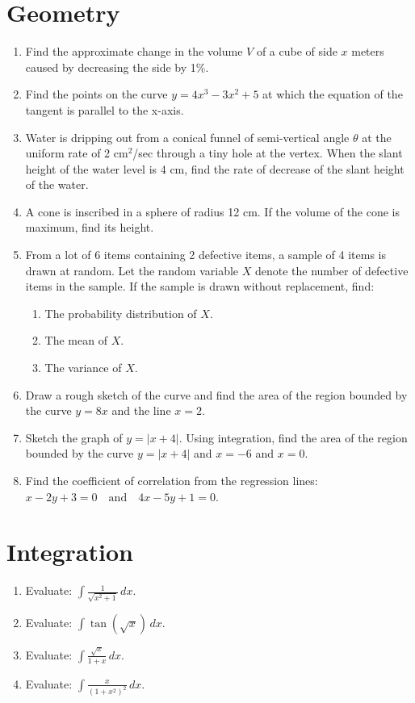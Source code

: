 \documentclass[a4paper,12pt]{article}
\begin{document}
\section{Geometry}
\begin{enumerate}


	\item Find the approximate change in the volume $V$ of a cube of side $x$ meters caused by decreasing the side by 1\%.
        \item Find the points on the curve $y = 4x^3 - 3x^2 + 5$ at which the equation of the tangent is parallel to the x-axis.
        \item Water is dripping out from a conical funnel of semi-vertical angle $\theta$ at the uniform rate of 2 cm$^2$/sec through a tiny hole at the vertex. When the slant height of the water level is 4 cm, find the rate of decrease of the slant height of the water.

        \item A cone is inscribed in a sphere of radius 12 cm. If the volume of the cone is maximum, find its height.
	\item
    From a lot of 6 items containing 2 defective items, a sample of 4 items is drawn at random. Let the random variable $X$ denote the number of defective items in the sample. If the sample is drawn without replacement, find:
    \begin{enumerate}
        \item The probability distribution of $X$.
        \item The mean of $X$.
        \item The variance of $X$.
    \end{enumerate}

    \item Draw a rough sketch of the curve and find the area of the region bounded by the curve $y = 8x$ and the line $x = 2$.
        \item Sketch the graph of $y = |x + 4|$. Using integration, find the area of the region bounded by the curve $y = |x + 4|$ and $x = -6$ and $x = 0$.
    \item Find the coefficient of correlation from the regression lines:
        $ x - 2y + 3 = 0 \quad \text{and} \quad 4x - 5y + 1 = 0. $
		\end{enumerate}
        

\section{Integration}
\begin{enumerate}



		\item Evaluate: $ \int \frac{1}{\sqrt{x^2 + 1}} \, dx $.
        \item Evaluate: $ \int \tan(\sqrt{x}) \, dx $.

		\item Evaluate: $ \int \frac{\sqrt{x}}{1 + x} \, dx $.
        \item Evaluate: $ \int \frac{x}{(1 + x^2)^2} \, dx $.
    

\end{enumerate}
\end{document}
